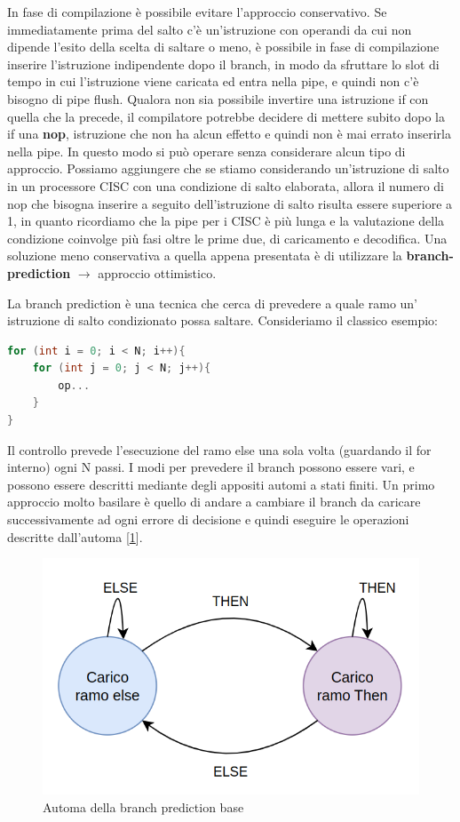 In fase di compilazione è possibile evitare l'approccio conservativo. Se immediatamente prima del salto c'è un'istruzione con operandi da cui non dipende l'esito della scelta di saltare o meno, è possibile in fase di compilazione inserire l'istruzione indipendente dopo il branch, in modo da sfruttare lo slot di tempo in cui l'istruzione viene caricata ed entra nella pipe, e quindi non c'è bisogno di pipe flush. Qualora non sia possibile invertire una istruzione if con quella che la precede, il compilatore potrebbe decidere di mettere subito dopo la if una \textbf{nop}, istruzione che non ha alcun effetto e quindi non è mai errato inserirla nella pipe. In questo modo si può operare senza considerare alcun tipo di approccio. Possiamo aggiungere che se stiamo considerando un'istruzione di salto in un processore CISC con una condizione di salto elaborata, allora il numero di nop che bisogna inserire a seguito dell'istruzione di salto risulta essere superiore a 1, in quanto ricordiamo che la pipe per i CISC è più lunga e la valutazione della condizione coinvolge più fasi oltre le prime due, di caricamento e decodifica.
Una soluzione meno conservativa a quella appena presentata è di utilizzare la \textbf{branch-prediction} $\rightarrow$ approccio ottimistico.

\noindent La branch prediction è una tecnica che cerca di prevedere a quale ramo un' istruzione di salto condizionato possa saltare. Consideriamo il classico esempio:
\begin{lstlisting}[language=C]
for (int i = 0; i < N; i++){
    for (int j = 0; j < N; j++){
        op...
    }
}
\end{lstlisting}

Il controllo prevede l'esecuzione del ramo else una sola volta (guardando il for interno) ogni N passi.
I modi per prevedere il branch possono essere vari, e possono essere descritti mediante degli appositi automi a stati finiti. Un primo approccio molto basilare è quello di andare a cambiare il branch da caricare successivamente ad ogni errore di decisione e quindi eseguire le operazioni descritte dall'automa [\ref{img:automa-semplice}].

\begin{figure}[ht]
    \centering
    \includegraphics[width=.5\textwidth]{fig/chapter_1/automa-semplice.png}
    \caption{Automa della branch prediction base}\label{img:automa-semplice}
\end{figure}

